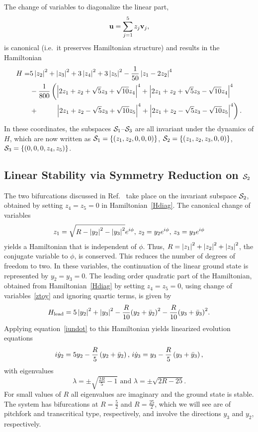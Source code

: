 \documentclass{article}
\numberwithin{equation}{section}
\numberwithin{figure}{section}
\begin{document}
The change of variables to diagonalize the linear part, 
$$
\mathbf{u} = \sum_{j=1}^5 z_j \mathbf{v}_j,
$$
is canonical (i.e.\ it preserves Hamiltonian structure) and results in the Hamiltonian
\begin{equation}
\label{Hdiag}
\begin{split}
H  = & 5 \abs{z_2}^2 + \abs{z_3}^2 + 3 \abs{z_4}^2 + 3 \abs{z_5}^2  
- \frac{1}{50}\abs{z_1 - 2 z_2}^4  \\
& - \frac{1}{800} \left(
   \abs{2 z_1+z_2+\sqrt{5} z_3 +  \sqrt{10} z_4}^4
 + \abs{2 z_1+z_2+\sqrt{5} z_3 -  \sqrt{10} z_4}^4  \right.\\
& + \left.   \phantom{\frac{1}{800}\left(\right.}
   \abs{2 z_1+z_2 -\sqrt{5} z_3 +  \sqrt{10} z_5}^4 
 + \abs{2 z_1+z_2-\sqrt{5} z_3 -  \sqrt{10} z_5}^4
 \right).
\end{split}
\end{equation}
In these coordinates, the subspaces $\mathcal{S}_1$--$\mathcal{S}_3$ are all invariant under the dynamics of $H$, which are now written as $\mathcal{S}_1 = \{(z_1,z_2,0,0,0)\}$, $\mathcal{S}_2 = \{(z_1,z_2,z_3,0,0)\}$, $\mathcal{S}_3  = \{(0,0,0,z_4,z_5)\}$.

\subsection{Linear Stability via Symmetry Reduction on $\mathcal{S}_2$}
The two bifurcations discussed in Ref.~\cite{Marzuola:2016bl} take place on the invariant subspace $\mathcal{S}_2$, obtained by setting $z_4 = z_5 = 0$ in Hamiltonian~\eqref{Hdiag}. The canonical change of variables 
\begin{equation}
\label{ztoy}
z_1 = \sqrt{R- \left\lvert y_2\right\rvert^2 - \left\lvert y_3\right\rvert^2} e^{i\phi}, \,
z_2 = y_2 e^{i\phi}, \,
z_3 = y_3 e^{i\phi}
\end{equation}
yields a Hamiltonian that is independent of $\phi$. Thus, $R = \left\lvert z_1\right\rvert^2 + \left\lvert z_2\right\rvert^2 + \left\lvert z_3\right\rvert^2$, the conjugate variable to $\phi$, is conserved. This reduces the number of degrees of freedom to two. In these variables, the continuation of the linear ground state is represented by $y_2 = y_3 = 0$. The leading order quadratic part of the Hamiltonian, obtained from Hamiltonian~\eqref{Hdiag} by setting $z_4=z_5=0$, using change of variables~\eqref{ztoy} and ignoring quartic terms, is given by
$$
H_{\rm lead} = 5 \left\lvert y_2\right\rvert^2 +  \left\lvert y_3\right\rvert^2
-\frac{R}{10} {\left( y_2 + \bar{y}_2 \right)}^2
-\frac{R}{10} {\left(y_3 + \bar{y}_3 \right)}^2.
$$
Applying equation~\eqref{iundot} to this Hamiltonian yields linearized evolution equations
$$
i \dot{y}_2 = 5 y_2-\frac{R}{5} \left(y_2+\bar{y}_2\right), \,
i \dot{y}_3 =  y_3-\frac{R}{5} \left(y_3+\bar{y}_3\right), 
$$
with eigenvalues
$$
\lambda = \pm \sqrt{\tfrac{2R}{5}-1} \text{ and } 
\lambda = \pm \sqrt{2R-25}.
$$
For small values of $R$ all eigenvalues are imaginary and the ground state is stable.
The system has bifurcations at $R = \tfrac{5}{2}$ and $R = \tfrac{25}{2}$, which we will see are of pitchfork and transcritical type, respectively, and involve the directions $y_3$ and $y_2$, respectively.
\end{document}
